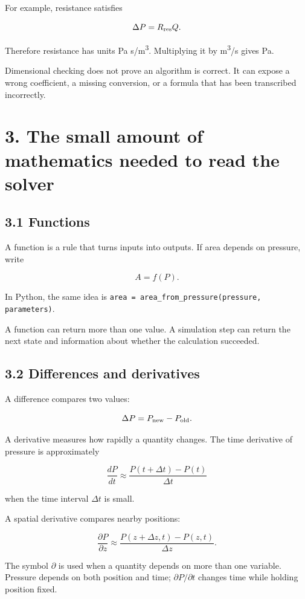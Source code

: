 \documentclass[11pt,a4paper]{article}
\begin{document}
For example, resistance satisfies


\begingroup\small
\[
\Delta P=R_{\rm res}Q.
\]
\endgroup


Therefore resistance has units Pa s/m\textsuperscript{3}. Multiplying it by m\textsuperscript{3}/s gives Pa.

Dimensional checking does not prove an algorithm is correct. It can expose a wrong coefficient, a missing conversion, or a formula that has been transcribed incorrectly.

\clearpage
\section{3. The small amount of mathematics needed to read the solver}
\subsection{3.1 Functions}
A function is a rule that turns inputs into outputs. If area depends on pressure, write


\begingroup\small
\[
A=f(P).
\]
\endgroup


In Python, the same idea is \texttt{area = area\_\allowbreak{}from\_\allowbreak{}pressure(pressure, parameters)}.

A function can return more than one value. A simulation step can return the next state and information about whether the calculation succeeded.

\subsection{3.2 Differences and derivatives}
A difference compares two values:


\begingroup\small
\[
\Delta P=P_{\rm new}-P_{\rm old}.
\]
\endgroup


A derivative measures how rapidly a quantity changes. The time derivative of pressure is approximately


\begingroup\small
\[
\frac{dP}{dt}\approx\frac{P(t+\Delta t)-P(t)}{\Delta t}
\]
\endgroup


when the time interval \(\Delta t\) is small.

A spatial derivative compares nearby positions:


\begingroup\small
\[
\frac{\partial P}{\partial z}
\approx\frac{P(z+\Delta z,t)-P(z,t)}{\Delta z}.
\]
\endgroup


The symbol \(\partial\) is used when a quantity depends on more than one variable. Pressure depends on both position and time; \(\partial P/\partial t\) changes time while holding position fixed.
\end{document}
